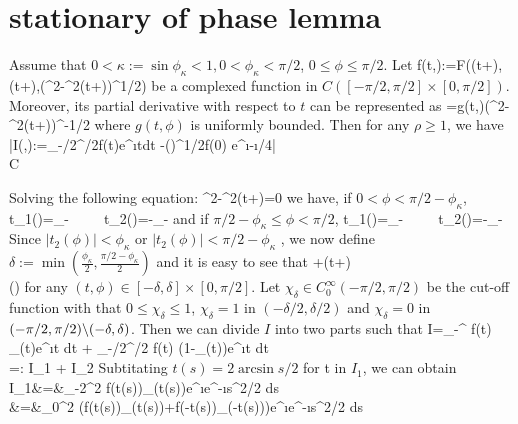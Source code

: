 \documentclass[12pt]{iopart}
\begin{document}
	\section{stationary of phase lemma}
	\begin{lem}
		Assume that $0<\kappa:=\sin\phi_\kappa<1,0<\phi_\kappa<\pi/2$, $0\leq\phi\leq\pi/2$. Let 
		\be
		f(t,\phi):=F(\sin(t+\phi),\cos(t+\phi),(\kappa^2-\sin^2(t+\phi))^{1/2})
		\ee
		be a complexed function in $C([-\pi/2,\pi/2]\times[0,\pi/2])$. Moreover, its partial derivative with respect to $t$ can be represented as
		\be\label{repre}
		=g(t,\phi)(\kappa^2-\sin^2(t+\phi))^{-1/2}
		\ee 
		where $g(t,\phi)$ is uniformly bounded. Then for any $\rho\geq1$, we have
		\be\nn
		\bigg|I(\rho,\phi):=\int_{-\pi/2}^{\pi/2}f(t)e^{\i\rho\cos t}dt
		-\bigg(\frac{2\pi}{\rho}\bigg)^{1/2}f(0) e^{\i\rho-\i\pi/4}\bigg| \\
		\leq C
		\ee	
	\end{lem}
	\debproof
	Solving the following equation:
	\ben
	\kappa^2-\sin^2(t+\phi)=0
	\een
	we have, if $0<\phi<\pi/2-\phi_\kappa$,
	\ben
	t_1(\phi)=\phi_\kappa-\phi \ \ \ \ \ t_2(\phi)=-\phi_\kappa-\phi
	\een
	and if $\pi/2-\phi_\kappa\leq\phi<\pi/2$,
	\ben
	t_1(\phi)=\phi_\kappa-\phi  \ \ \ \ \ t_2(\phi)=\pi-\phi_\kappa-\phi
	\een
	Since $|t_2(\phi)|<\phi_\kappa$ or $|t_2(\phi)|<\pi/2-\phi_\kappa$ , we now define $\delta:=\min(\frac{\phi_\kappa}{2},\frac{\pi/2-\phi_\kappa}{2})$ and it is easy to see that
	\be \label{neq_1}
	\kappa+\sin(t+\phi)\\ \label{neq_2}
	\cos()
	\ee
	for any $(t,\phi)\in[-\delta,\delta]\times[0,\pi/2]$.  Let $\chi_\delta\in C^\infty_0(-\pi/2,\pi/2)$ be the cut-off function with that $0\leq\chi_\delta\leq1$, $\chi_\delta=1$ in $(-\delta/2,\delta/2)$ and $\chi_\delta=0$  in $(-\pi/2,\pi/2)\backslash(-\delta,\delta)$. Then we can divide $I$ into two parts such that
	\ben\label{I_splits}
	I=\int_{-\delta}^{\delta} f(t) \chi_\delta(t)e^{\i \rho\cos t} dt +
	\int_{-\pi/2}^{\pi/2} f(t) (1-\chi_\delta(t))e^{\i \rho\cos t} dt  \\ 
	=: I_{1} + I_{2}
	\een
    Subtitating $t(s)=2\arcsin s/2$ for t in $I_{1}$, we can obtain
	\be\hspace{-1cm}
	I_{1}&=&\int_{-2\sin{}}^{2\sin{}}  f(t(s))\chi_\delta(t(s))e^{\i  \rho}e^{-\i \rho s^2/2} ds \\ \hspace{-1cm}
	&=&\int_{0}^{2\sin{}}  (f(t(s))\chi_\delta(t(s))+f(-t(s))\chi_\delta(-t(s)))e^{\i  \rho}e^{-\i \rho s^2/2} ds  \\ \hspace{-1cm}
\end{document}
